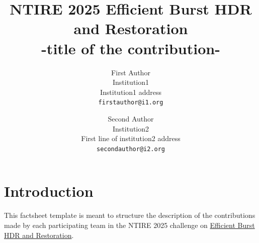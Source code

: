 \documentclass[10pt,twocolumn,letterpaper]{article}
\begin{document}
\title{NTIRE 2025 Efficient Burst HDR and Restoration\\-title of the contribution-}






\author{First Author\\
Institution1\\
Institution1 address\\
{\tt\small firstauthor@i1.org}
\and
Second Author\\
Institution2\\
First line of institution2 address\\
{\tt\small secondauthor@i2.org}
}
\maketitle


\section{Introduction}

This factsheet template is meant to structure the description of the contributions made by each participating team in the NTIRE 2025 challenge on \href{https://codalab.lisn.upsaclay.fr/competitions/21316}{Efficient Burst HDR and Restoration}.
\end{document}
